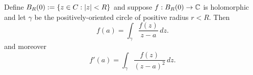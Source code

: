 \documentclass{homework}
\begin{document}
                                                                                                                                                                                                 \pagebreak
                                                                                                                                                                                                 \begin{problem}\label{cauchy-integral-formula}
                                                                                                                                                                                                 Define $B_R(0) := \{ z \in C : \left|z\right| < R \}$ and suppose
                                                                                                                                                                                                   $f : B_R(0) \to \mathbb{C}$ is holomorphic and let $\gamma$ be the
                                                                                                                                                                                                     positively-oriented circle of positive radius $r < R$.  Then
                                                                                                                                                                                                       \[
                                                                                                                                                                                                           f(a) = \int_\gamma \frac{f(z)}{z-a} \, dz.
                                                                                                                                                                                                             \]
                                                                                                                                                                                                               and moreover
                                                                                                                                                                                                                 \[
                                                                                                                                                                                                                     f'(a) = \int_\gamma \frac{f(z)}{(z-a)^2} \, dz.
                                                                                                                                                                                                                       \]  
                                                                                                                                                                                                                       \end{problem}
\end{document}
